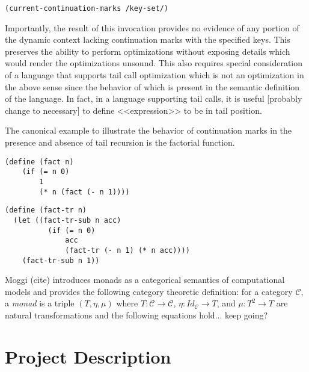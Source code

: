 \documentclass[ms]{byuprop}
\begin{document}
\begin{verbatim}
(current-continuation-marks /key-set/)
\end{verbatim}

Importantly, the result of this invocation provides no evidence of any portion of the dynamic context lacking continuation marks with the specified keys. This preserves the ability to perform optimizations without exposing details which would render the optimizations unsound. This also requires special consideration of a language that supports tail call optimization which is not an optimization in the above sense since the behavior of which is present in the semantic definition of the language. In fact, in a language supporting tail calls, it is useful [probably change to necessary] to define <<expression>> to be in tail position.

The canonical example to illustrate the behavior of continuation marks in the presence and absence of tail recursion is the factorial function.

\begin{verbatim}
(define (fact n)
    (if (= n 0)
        1
        (* n (fact (- n 1))))
\end{verbatim}

\begin{verbatim}
(define (fact-tr n)
  (let ((fact-tr-sub n acc)
          (if (= n 0)
              acc
              (fact-tr (- n 1) (* n acc))))
    (fact-tr-sub n 1))
\end{verbatim}

Moggi (cite) introduces monads as a categorical semantics of computational models and provides the following category theoretic definition: for a category $\mathcal{C}$, a \emph{monad} is a triple $(T,\eta,\mu)$ where $T:\mathcal{C}\rightarrow\mathcal{C}$, $\eta:Id_{\mathcal{C}}\rightarrow T$, and $\mu:T^{2}\rightarrow T$ are natural transformations and the following equations hold... keep going?








\section{Project Description}
\end{document}
